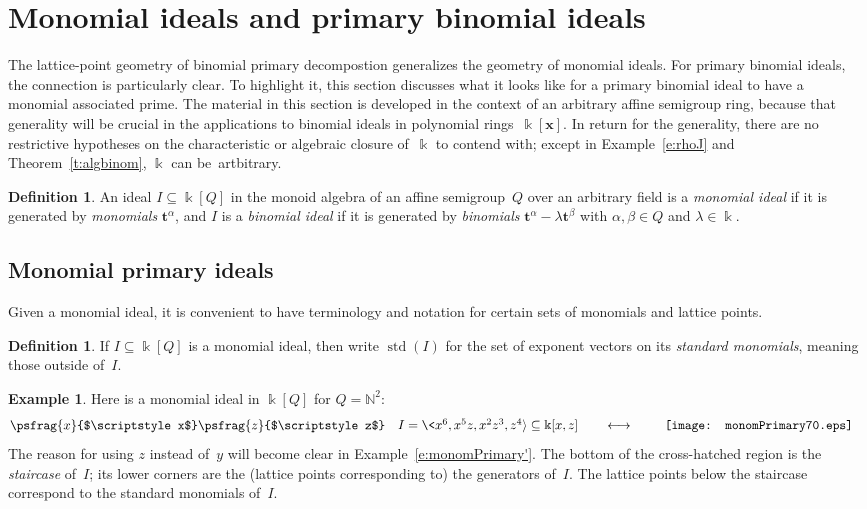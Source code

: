 \documentclass[12pt]{amsart}
\numberwithin{equation}{section}
\theoremstyle{definition}
\newtheorem{defn}[thm]{Definition}
\newtheorem{example}[thm]{Example}
\begin{document}
\section{Monomial ideals and primary binomial ideals}\label{s:primary}

The lattice-point geometry of binomial primary decompostion
generalizes the geometry of monomial ideals.  For primary binomial
ideals, the connection is particularly clear.  To highlight it, this
section discusses what it looks like for a primary binomial ideal to
have a monomial associated prime.  The material in this section is
developed in the context of an arbitrary affine semigroup ring,
because that generality will be crucial in the applications to
binomial ideals in polynomial rings~${\Bbbk}[{\mathbf{x}}]$.  In return for the
generality, there are no restrictive hypotheses on the characteristic
or algebraic closure of~${\Bbbk}$ to contend with; except in
Example~\ref{e:rhoJ} and Theorem~\ref{t:algbinom}, ${\Bbbk}$ can
be~artbitrary.

\begin{defn}
An ideal $I \subseteq {\Bbbk}[Q]$ in the monoid algebra of an affine
semigroup~$Q$ over an arbitrary field is a \emph{monomial ideal} if it
is generated by \emph{monomials} ${{\mathbf{t}}}^\alpha$, and $I$ is a
\emph{binomial ideal} if it is generated by \emph{binomials}
${{\mathbf{t}}}^\alpha - \lambda{{\mathbf{t}}}^\beta$ with $\alpha,\beta \in Q$ and $\lambda
\in {\Bbbk}$.
\end{defn}

\subsection{Monomial primary ideals}
Given a monomial ideal, it is convenient to have terminology and
notation for certain sets of monomials and lattice points.
\begin{defn}
If $I \subseteq {\Bbbk}[Q]$ is a monomial ideal, then write $\operatorname{std}(I)$ for
the set of exponent vectors on its \emph{standard monomials}, meaning
those outside of~$I$.
\end{defn}

\begin{example}\label{e:monomPrimary}
Here is a monomial ideal in ${\Bbbk}[Q]$ for $Q = {\mathbb{N}}^2$:
$$\psfrag{x}{$\scriptstyle x$}
\psfrag{z}{$\scriptstyle z$}
\begin{array}{cc}
  \begin{array}{c}
  I = \<x^6, x^5z, x^2z^3,z^4{\rangle} \subseteq {\Bbbk}[x,z]
  \qquad\longleftrightarrow\ \
  \end{array}
&
  \begin{array}{c}\texttt{[image: monomPrimary70.eps]}\end{array}
\end{array}
$$
The reason for using $z$ instead of~$y$ will become clear in
Example~\ref{e:monomPrimary'}.  The bottom of the cross-hatched region
is the \emph{staircase} of~$I$; its lower corners are the (lattice
points corresponding to) the generators of~$I$.  The lattice points
below the staircase correspond to the standard monomials of~$I$.
\end{example}
\end{document}
